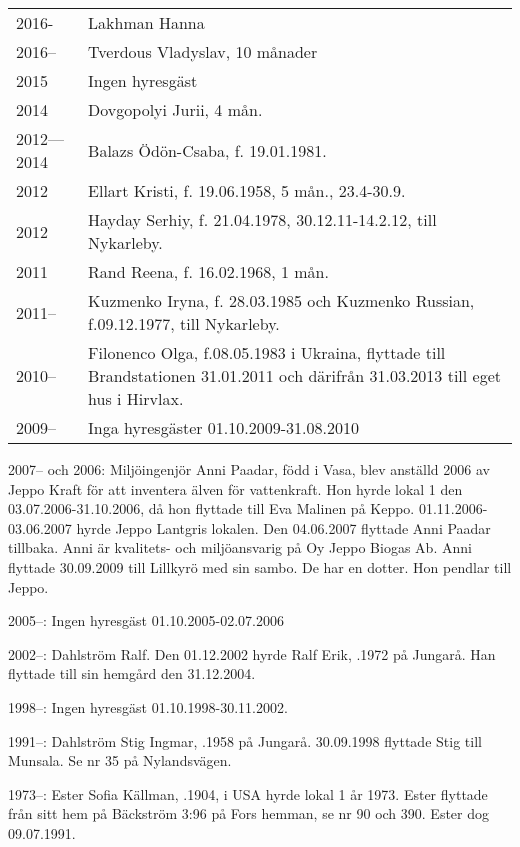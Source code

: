 \begin{tabular}{ll}
  2016-                   & Lakhman Hanna \\
  2016--\allowbreak 2016  & Tverdous Vladyslav, 10 månader \\
  2015                    & Ingen hyresgäst \\
  2014                    & Dovgopolyi Jurii, 4 mån. \\
  2012—2014               & Balazs Ödön-Csaba, f. 19.01.1981. \\
  2012	                  & Ellart Kristi, f. 19.06.1958,  5 mån., 23.4-30.9. \\
  2012                    & Hayday Serhiy, f. 21.04.1978, 30.12.11-14.2.12, till Nykarleby. \\
  2011                    & Rand Reena, f. 16.02.1968, 1 mån. \\
  2011--\allowbreak 2012  & Kuzmenko Iryna, f. 28.03.1985 och Kuzmenko Russian, f.09.12.1977, till Nykarleby. \\
  2010--\allowbreak 2011  & Filonenco Olga, f.08.05.1983 i Ukraina, flyttade till Brandstationen 31.01.2011 och därifrån 31.03.2013 till eget hus i Hirvlax. \\
  2009--\allowbreak 2010  & Inga hyresgäster 01.10.2009-31.08.2010 \\
\end{tabular}

2007-- och 2006:
Miljöingenjör Anni Paadar, född i Vasa, blev anställd 2006 av Jeppo Kraft för att inventera älven för vattenkraft. Hon hyrde lokal 1 den 03.07.2006-31.10.2006, då hon flyttade till Eva Malinen på Keppo.	01.11.2006-03.06.2007 hyrde Jeppo Lantgris lokalen. Den 04.06.2007 flyttade Anni Paadar tillbaka. Anni är kvalitets- och miljöansvarig på Oy Jeppo Biogas Ab. Anni flyttade 30.09.2009 till Lillkyrö med sin sambo. De har en dotter. Hon pendlar till Jeppo.

2005--:
Ingen hyresgäst 01.10.2005-02.07.2006

2002--:
Dahlström Ralf. Den 01.12.2002 hyrde Ralf	Erik, .1972 på Jungarå. Han flyttade till sin hemgård den 31.12.2004.

1998--:
Ingen hyresgäst 01.10.1998-30.11.2002.

1991--:
Dahlström Stig Ingmar, .1958 på Jungarå. 30.09.1998 flyttade Stig till Munsala. Se nr 35 på Nylandsvägen.

1973--:
Ester Sofia Källman, .1904, i USA hyrde lokal 1 år 1973. Ester flyttade från sitt hem på Bäckström 3:96 på Fors hemman, se nr 90 och 390. Ester dog 09.07.1991.



